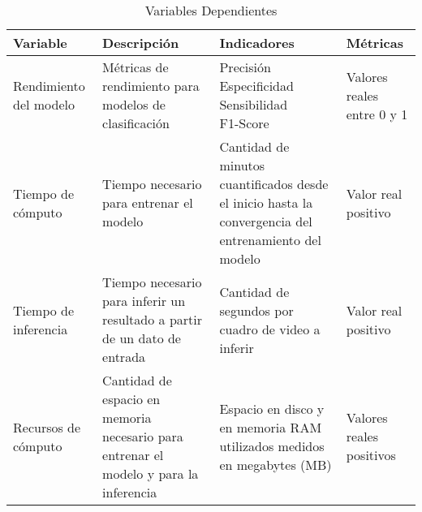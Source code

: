 \begin{table}[ht]
	\renewcommand{\arraystretch}{1.3}
	\centering
	\begin{tabular}{>{\centering}m{}>{\raggedright}m{}m{}m{}} \hline
		\rowcolor{TableShade}
		\hline
		\textbf{Variable}  & \textbf{Descripción} & \textbf{Indicadores} & \textbf{Métricas} \\ \hline 
		Rendimiento del modelo & Métricas de rendimiento para modelos de clasificación & \makecell[bl]{Precisión \\ Especificidad \\ Sensibilidad \\ F1-Score} & Valores reales entre 0 y 1 \\ \hline
		Tiempo de cómputo & Tiempo necesario para entrenar el modelo & Cantidad de minutos cuantificados desde el inicio hasta la convergencia del entrenamiento del modelo & Valor real positivo \\ \hline
		Tiempo de inferencia &Tiempo necesario para inferir un resultado a partir de un dato de entrada & Cantidad de segundos por cuadro de video a inferir & Valor real positivo \\ \hline
		Recursos de cómputo & Cantidad de espacio en memoria necesario para entrenar el modelo y para la inferencia & Espacio en disco y en memoria RAM utilizados medidos en megabytes (MB) & Valores reales positivos \\ \hline
	\end{tabular}
	\label{tab:VarDep}
	\caption{Variables Dependientes}
\end{table}
